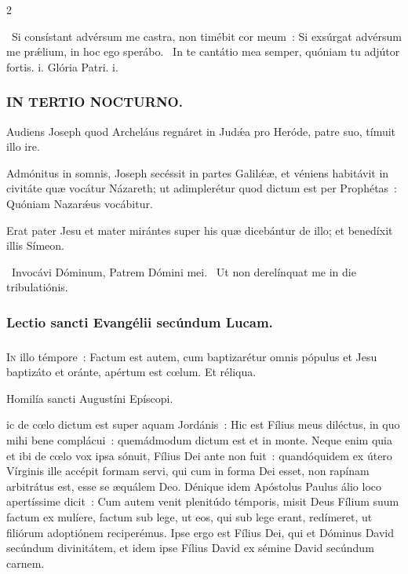 \documentclass[9pt,twoside]{extarticle}
\begin{document}
\begin{multicols}{2}
{{{\begin{tightlist}{}
\item {}~Si consístant advérsum me castra, non timébit cor meum~: \textred{*} Si exsúrgat advérsum me prǽlium, in hoc ego sperábo. ~In te cantátio mea semper, quóniam tu adjútor fortis. i. Glória Patri. i.
\end{tightlist}

\subsubsection*{\center \textsc{IN TERTIO NOCTURNO.}}
\begin{tightlist}{}
\item {} Audiens Joseph quod Archeláus regnáret in Judǽa pro Heróde, patre suo, tímuit illo ire.
\item {} Admónitus in somnis, Joseph secéssit in partes Galilǽæ, et véniens habitávit in civitáte quæ vocátur Názareth; ut adimplerétur quod dictum est per Prophétas~: Quóniam Nazarǽus vocábitur.
\item {} Erat pater Jesu et mater mirántes super his quæ dicebántur de illo; et benedíxit illis Símeon.
\item {}~Invocávi Dóminum, Patrem Dómini mei. ~Ut non derelínquat me in die tribulatiónis.
\end{tightlist}

\subsubsection*{\center Lectio sancti Evangélii secúndum Lucam.}
\subsubsection*{\center {}}
\lettrine{I}n illo témpore~: Factum est autem, cum baptizarétur omnis pópulus et Jesu baptizáto et oránte, apértum est cœlum. Et réliqua.

\begin{center}Homilía sancti Augustíni Epíscopi.\\
\end{center}
ic de cœlo dictum est super aquam Jordánis~: Hic est Fílius meus diléctus, in quo mihi bene complácui~: quemádmodum dictum est et in monte. Neque enim quia et ibi de cœlo vox ipsa sónuit, Fílius Dei ante non fuit~: quandóquidem ex útero Vírginis ille accépit formam servi, qui cum in forma Dei esset, non rapínam arbitrátus est, esse se æquálem Deo. Dénique idem Apóstolus Paulus álio loco apertíssime dicit~: Cum autem venit plenitúdo témporis, misit Deus Fílium suum factum ex mulíere, factum sub lege, ut eos, qui sub lege erant, redímeret, ut filiórum adoptiónem reciperémus. Ipse ergo est Fílius Dei, qui et Dóminus David secúndum divinitátem, et idem ipse Fílius David ex sémine David secúndum carnem.

}}}
\end{multicols}
\end{document}
